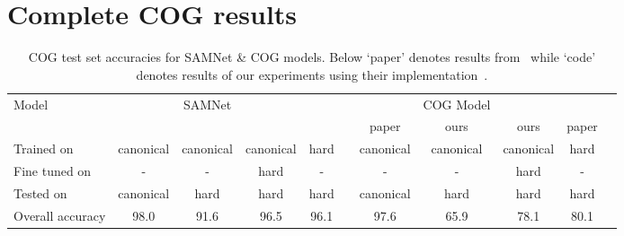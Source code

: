\clearpage
\section{Complete COG results}
\label{sec:cog-all-results}

\begin{table*}[htb]
	\caption{COG test set accuracies for SAMNet \& COG models. Below `paper' denotes results from~\cite{yang2018dataset}  while `code' denotes results of our experiments using their implementation~\cite{yang2018implement}.}
	\centering
	\begin{adjustbox}{width=\columnwidth}
	\begin{tabular}{lcccccccccc}
		\toprule
		Model & & SAMNet & && && COG Model&& \\
		\cmidrule{2-5} \cmidrule{7-11} 
		&&&&& & paper & ours & ours & paper&\\
		\cmidrule{7-9} \cmidrule{10-11}
		Trained on       & canonical & canonical & canonical & hard &           &  canonical  & canonical  & canonical & hard \\ 
		Fine tuned on  & - & - & hard  & - &           & -   & - & hard & - \\ 
		Tested on        & canonical & hard & hard & hard &            &canonical  & hard & hard & hard  \\ 
		\midrule
		
		Overall accuracy & 98.0 & 91.6 & 96.5  & 96.1 &           & 97.6  & 65.9 & 78.1& 80.1 \\ 
		
		\midrule 
		

\end{tabular}
\end{adjustbox}
\end{table*}
